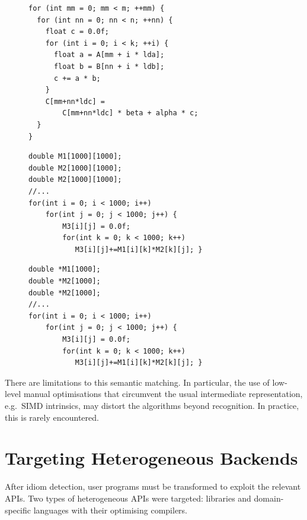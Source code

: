\begin{figure}[p]
\begin{lstlisting}[language=MyCpp]
for (int mm = 0; mm < m; ++mm) {
  for (int nn = 0; nn < n; ++nn) {
    float c = 0.0f;
    for (int i = 0; i < k; ++i) {
      float a = A[mm + i * lda]; 
      float b = B[nn + i * ldb];
      c += a * b;
    }
    C[mm+nn*ldc] =
        C[mm+nn*ldc] * beta + alpha * c;
  }
}
\end{lstlisting}
\begin{lstlisting}[language=MyCpp,label={fig:gemmexamples},caption=
   {Two matching instances of GEMM:
    Although both loop nests are implemented very differently, they both match
    the same IDL specification and can be accelerated identically.}]
double M1[1000][1000];
double M2[1000][1000];
double M2[1000][1000];
//...
for(int i = 0; i < 1000; i++)
    for(int j = 0; j < 1000; j++) {
        M3[i][j] = 0.0f;
        for(int k = 0; k < 1000; k++)
           M3[i][j]+=M1[i][k]*M2[k][j]; }
\end{lstlisting}
\begin{lstlisting}[language=MyCpp,label={fig:gemmcounterexamples},caption=
   {This C program that does not match {\tt GEMM}.
    Although the loop syntax is identical to the matching example from
    \Cref{fig:gemmexamples}, the different types of the matrices prevent
    detection.
    This is desirable:
    Established backends are incompatible with such non-contiguous memory
    layout.}]
double *M1[1000];
double *M2[1000];
double *M2[1000];
//...
for(int i = 0; i < 1000; i++)
    for(int j = 0; j < 1000; j++) {
        M3[i][j] = 0.0f;
        for(int k = 0; k < 1000; k++)
           M3[i][j]+=M1[i][k]*M2[k][j]; }
\end{lstlisting}
\end{figure}

    There are limitations to this semantic matching.
    In particular, the use of low-level manual optimisations that circumvent the
    usual intermediate representation, e.g.\ SIMD intrinsics, may distort the
    algorithms beyond recognition.
    In practice, this is rarely encountered.

\section{Targeting Heterogeneous Backends}

    After idiom detection, user programs must be transformed to exploit the
    relevant APIs.
    Two types of heterogeneous APIs were targeted:
    libraries and domain-specific languages with their optimising compilers.

